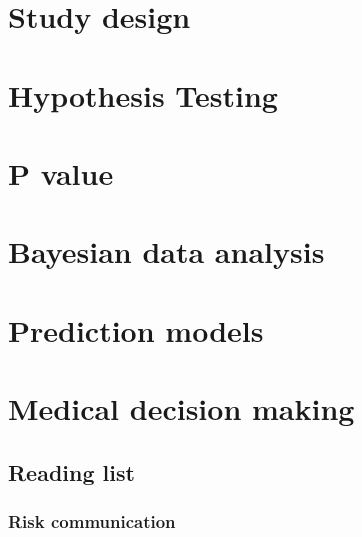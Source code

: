 \documentclass[]{book}
\begin{document}
\hypertarget{StudyDesign}{%
\chapter{Study design}\label{StudyDesign}}

\hypertarget{HypothesisTesting}{%
\chapter{Hypothesis Testing}\label{HypothesisTesting}}

\hypertarget{Pvalue}{%
\chapter{P value}\label{Pvalue}}

\hypertarget{Bayesian}{%
\chapter{Bayesian data analysis}\label{Bayesian}}

\hypertarget{PredictionModels}{%
\chapter{Prediction models}\label{PredictionModels}}

\hypertarget{mdm}{%
\chapter{Medical decision making}\label{mdm}}

\hypertarget{reading-list-1}{%
\section{Reading list}\label{reading-list-1}}

\hypertarget{risk-communication}{%
\subsection{Risk communication}\label{risk-communication}}
\end{document}
